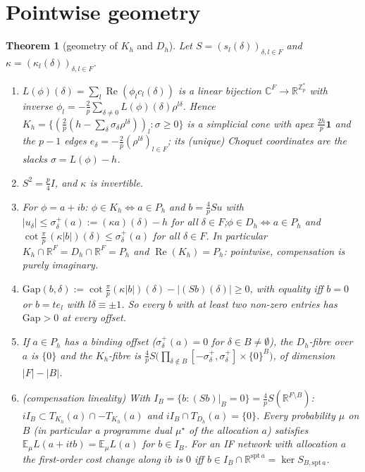 \documentclass[11pt]{article}
\newtheorem{theorem}{Theorem}
\theoremstyle{remark}
\newcommand{\E}{\mathbb E}
\newcommand{\Re}{\operatorname{Re}}
\renewcommand{\Re}{\operatorname{Re}}
\begin{document}
\section{Pointwise geometry}
\begin{theorem}[geometry of $K_h$ and $D_h$]\label{thm:G}
Let $S=(s_l(\delta))_{\delta,l\in F}$ and $\kappa=(\kappa_l(\delta))_{\delta,l\in F}$.
\begin{enumerate}
\item[(i)] $L(\phi)(\delta)=\sum_l\Re(\phi_lc_l(\delta))$ is a linear bijection $\mathbb C^F\to\mathbb R^{\mathbb Z_p^*}$ with inverse
$\phi_l=-\frac2p\sum_{\delta\ne0}L(\phi)(\delta)\rho^{l\delta}$.  Hence
$K_h=\{(\frac2p(h-\sum_\delta\sigma_\delta\rho^{l\delta}))_l:\sigma\ge0\}$ is a simplicial cone with apex $\frac{2h}p\mathbf 1$ and the
$p-1$ edges $e_\delta=-\frac2p(\rho^{l\delta})_{l\in F}$; its (unique) Choquet coordinates are the slacks $\sigma=L(\phi)-h$.
\item[(ii)] $S^2=\frac p4I$, and $\kappa$ is invertible.
\item[(iii)] For $\phi=a+ib$: $\phi\in K_h\iff a\in P_h$ and $b=\frac4pSu$ with $|u_\delta|\le\sigma^+_\delta(a):=(\kappa a)(\delta)-h$
for all $\delta\in F$;\quad $\phi\in D_h\iff a\in P_h$ and $\cot\frac\pi p\,(\kappa|b|)(\delta)\le\sigma^+_\delta(a)$ for all $\delta\in F$.
In particular $K_h\cap\mathbb R^F=D_h\cap\mathbb R^F=P_h$ and $\Re(K_h)=P_h$: pointwise, compensation is purely imaginary.
\item[(iv)] $\mathrm{Gap}(b,\delta):=\cot\frac\pi p(\kappa|b|)(\delta)-|(Sb)(\delta)|\ge0$, with equality iff $b=0$ or $b=te_l$ with $l\delta\equiv\pm1$.
So every $b$ with at least two non-zero entries has $\mathrm{Gap}>0$ at every offset.
\item[(v)] If $a\in P_h$ has a binding offset ($\sigma^+_\delta(a)=0$ for $\delta\in B\ne\emptyset$), the $D_h$-fibre over $a$ is $\{0\}$ and the
$K_h$-fibre is $\frac4pS\big(\prod_{\delta\notin B}[-\sigma^+_\delta,\sigma^+_\delta]\times\{0\}^B\big)$, of dimension $|F|-|B|$.
\item[(vi)] (compensation lineality) With $I_B=\{b:(Sb)|_B=0\}=\frac4pS(\mathbb R^{F\setminus B})$:
$iI_B\subset T_{K_h}(a)\cap-T_{K_h}(a)$ and $iI_B\cap T_{D_h}(a)=\{0\}$.  Every probability $\mu$ on $B$ (in particular a programme
dual $\mu^\star$ of the allocation $a$) satisfies $\E_\mu L(a+itb)=\E_\mu L(a)$ for $b\in I_B$.  For an IF network with allocation $a$
the first-order cost change along $ib$ is $0$ iff $b\in I_B\cap\mathbb R^{\mathrm{spt}\,a}=\ker S_{B,\mathrm{spt}\,a}$.
\end{enumerate}
\end{theorem}
\end{document}
